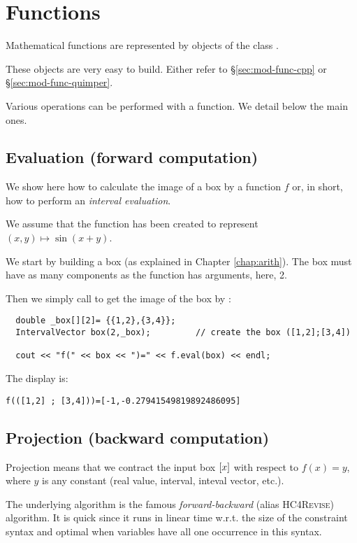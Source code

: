 \section{Functions}\label{sec:mod-func}

Mathematical functions are represented by objects of the class .

These objects are very easy to build. Either refer to \S\ref{sec:mod-func-cpp}
or \S\ref{sec:mod-func-quimper}.

Various operations can be performed with a function. We detail below the main ones.

\subsection{Evaluation (forward computation)}

We show here how to calculate the image of a box by a function $f$ or, in short, how
to perform an {\it interval evaluation}.

We assume that the function  has been created to represent $(x,y)\mapsto \sin(x+y)$.

We start by building a box (as explained in Chapter \ref{chap:arith}).
The box must have as many components as the function has arguments, here, 2.

Then we simply call  to get the image of the box by :

\begin{lstlisting}
  double _box[][2]= {{1,2},{3,4}};
  IntervalVector box(2,_box);         // create the box ([1,2];[3,4])

  cout << "f(" << box << ")=" << f.eval(box) << endl; 
\end{lstlisting}

The display is:
\begin{verbatim}
f(([1,2] ; [3,4]))=[-1,-0.27941549819892486095]
\end{verbatim}

\subsection{Projection (backward computation)}
	
Projection means that we contract the input box $[x]$
with respect to $f(x)=y$, where $y$ is any constant (real value, interval,
inteval vector, etc.).

The underlying algorithm is the famous {\it forward-backward} (alias \textsc{HC4Revise})
algorithm. It is quick since it runs in linear time w.r.t. the size
of the constraint syntax and optimal when variables have all one occurrence
in this syntax.

